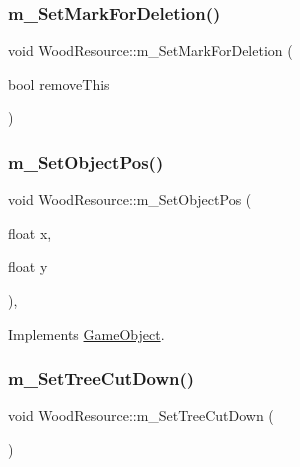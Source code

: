 \subsubsection{\texorpdfstring{m\+\_\+\+Set\+Mark\+For\+Deletion()}{m\_SetMarkForDeletion()}}
{\footnotesize\ttfamily void Wood\+Resource\+::m\+\_\+\+Set\+Mark\+For\+Deletion (\begin{DoxyParamCaption}\item[{bool}]{remove\+This }\end{DoxyParamCaption})}

\mbox{\label{class_wood_resource_afa9f748e3dea5f08c18dd831f04d9287}} 
\subsubsection{\texorpdfstring{m\+\_\+\+Set\+Object\+Pos()}{m\_SetObjectPos()}}
{\footnotesize\ttfamily void Wood\+Resource\+::m\+\_\+\+Set\+Object\+Pos (\begin{DoxyParamCaption}\item[{float}]{x,  }\item[{float}]{y }\end{DoxyParamCaption})\hspace{0.3cm}{\ttfamily [override]}, {\ttfamily [virtual]}}



Implements \mbox{\hyperlink{class_game_object_ad1f8ea8eb3673b1af8215bf92cdc0df8}{Game\+Object}}.

\mbox{\label{class_wood_resource_a90aadace134336f71aed1c167983c711}} 
\subsubsection{\texorpdfstring{m\+\_\+\+Set\+Tree\+Cut\+Down()}{m\_SetTreeCutDown()}}
{\footnotesize\ttfamily void Wood\+Resource\+::m\+\_\+\+Set\+Tree\+Cut\+Down (\begin{DoxyParamCaption}{ }\end{DoxyParamCaption})}

